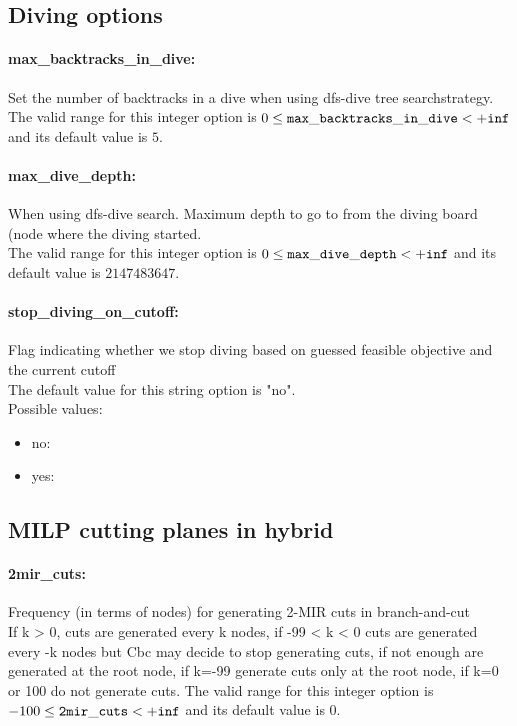 \subsection{Diving options}
\label{sec:Diving_options}
\paragraph{max\_backtracks\_in\_dive:} Set the number of backtracks in a dive when using dfs-dive tree searchstrategy. $\;$ \\
 The valid range for this integer option is
$0 \le {\tt max\_backtracks\_in\_dive } <  {\tt +inf}$
and its default value is $5$.


\paragraph{max\_dive\_depth:} When using dfs-dive search. Maximum depth to go to from the diving board (node where the diving started. $\;$ \\
 The valid range for this integer option is
$0 \le {\tt max\_dive\_depth } <  {\tt +inf}$
and its default value is $2147483647$.


\paragraph{stop\_diving\_on\_cutoff:} Flag indicating whether we stop diving based on guessed feasible objective and the current cutoff $\;$ \\

The default value for this string option is "no".
\\ 
Possible values:
\begin{itemize}
   \item no: 
   \item yes: 
\end{itemize}

\subsection{MILP cutting planes in hybrid}
\label{sec:MILP_cutting_planes_in_hybrid}
\paragraph{2mir\_cuts:} Frequency (in terms of nodes) for generating 2-MIR cuts in branch-and-cut $\;$ \\
 If k > 0, cuts are generated every k nodes, if
-99 < k < 0 cuts are generated every -k nodes but
Cbc may decide to stop generating cuts, if not
enough are generated at the root node, if k=-99
generate cuts only at the root node, if k=0 or
100 do not generate cuts. The valid range for this integer option is
$-100 \le {\tt 2mir\_cuts } <  {\tt +inf}$
and its default value is $0$.


